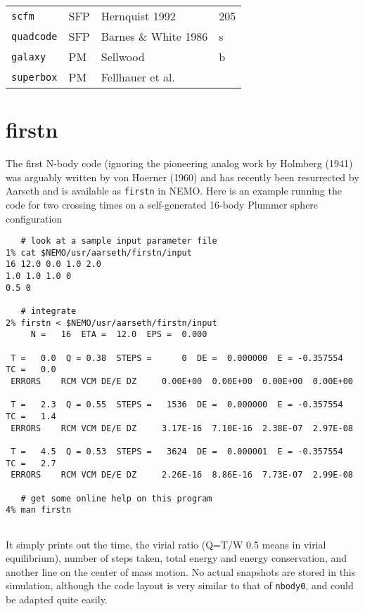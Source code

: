 \begin{center}
\begin{table}[h]
\begin{tabular}{||l|l|l|l||}
{\tt scfm} & SFP & Hernquist 1992 & 205 \\

{\tt quadcode} & SFP & Barnes \& White 1986 & s \\

{\tt galaxy} & PM & Sellwood  & b \\

{\tt superbox} & PM &  Fellhauer et al. & \\

\hline 

\end{tabular}
\label{t:codes}
\end{table}
\end{center}

\section{firstn}

The first N-body code (ignoring the pioneering analog work by 
Holmberg (1941)
was arguably written by von Hoerner (1960)  %
and has recently
been resurrected by Aarseth and is available as {\tt firstn} in NEMO. Here is an
example running the code for two crossing times on a self-generated 16-body
Plummer sphere configuration

\footnotesize\begin{verbatim}
   # look at a sample input parameter file
1% cat $NEMO/usr/aarseth/firstn/input
16 12.0 0.0 1.0 2.0
1.0 1.0 1.0 0
0.5 0

   # integrate 
2% firstn < $NEMO/usr/aarseth/firstn/input
     N =   16  ETA =  12.0  EPS =  0.000
 
 T =   0.0  Q = 0.38  STEPS =      0  DE =  0.000000  E = -0.357554  TC =   0.0
 ERRORS    RCM VCM DE/E DZ     0.00E+00  0.00E+00  0.00E+00  0.00E+00
 
 T =   2.3  Q = 0.55  STEPS =   1536  DE =  0.000000  E = -0.357554  TC =   1.4
 ERRORS    RCM VCM DE/E DZ     3.17E-16  7.10E-16  2.38E-07  2.97E-08
 
 T =   4.5  Q = 0.53  STEPS =   3624  DE =  0.000001  E = -0.357554  TC =   2.7
 ERRORS    RCM VCM DE/E DZ     2.26E-16  8.86E-16  7.73E-07  2.99E-08

   # get some online help on this program
4% man firstn
 
\end{verbatim}\normalsize

It simply prints out the time, the virial ratio (Q=T/W 0.5 means in virial
equilibrium), number of steps taken, total energy and energy conservation, and another 
line on the center of mass motion. No actual snapshots are stored in this 
simulation, although the code layout is very similar to that of {\tt nbody0},
and could be adapted quite easily.

